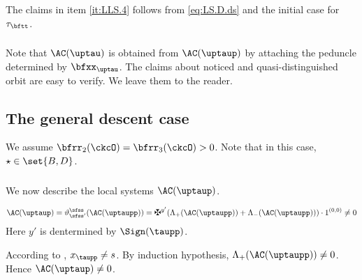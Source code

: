 \documentclass[ssunip]{subfiles}
\begin{document}

The claims in item \ref{it:LLS.4} follows from \eqref{eq:LS.D.ds} and the initial
case for $\tau_{\bftt}$.

\subsubsection{}

Note that $\oAC{\uptau}$ is obtained from $\oAC{\uptaup}$ by attaching the peduncle
determined by $\bfxx_{\uptau}$. The claims about noticed and
quasi-distinguished orbit are easy to verify. We leave them to the reader.



\subsection{The general descent case}\label{sec:pf.gd.CD}
We assume $\bfrr_{2}(\ckcO) = \bfrr_{3}(\ckcO)>0$.
Note that in this case, $\star\in \set{B,D}$.

\subsubsection{}
We now describe the local systems $\AC( \uptaup )$.

\begin{equation}\label{eq:LS.taup}
  \AC( \uptaup ) = \vartheta_{\sfss'}^{\sfss}(\AC(\uptaupp)) = \maltese^{y'}
  (\Lambda_{+}( \AC(\uptaupp)) + \Lambda_{-}(\AC(\uptaupp)))\cdot 1^{(0,0)} \neq 0
\end{equation}
Here $y'$ is dentermined by $\Sign(\taupp)$.


According to ,  $x_{\taupp}\neq s$.
By induction hypothesis, $\Lambda_{+}(\AC(\uptaupp)) \neq 0$. Hence
$\AC(\uptaup)\neq 0$.

\end{document}
